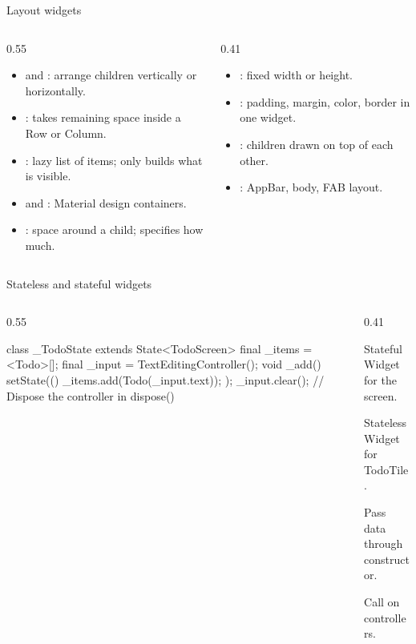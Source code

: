 \documentclass[10pt,aspectratio=169,t]{beamer}
\begin{document}
\begin{frame}[eyebrow=Reference]{Layout widgets}
  \begin{columns}[T]
    \begin{column}{0.55\textwidth}
      \begin{itemize}
        \item {} and : arrange children vertically or horizontally.
        \item {}: takes remaining space inside a Row or Column.
        \item {}: lazy list of items; only builds what is visible.
        \item {} and : Material design containers.
        \item {}: space around a child;  specifies how much.
      \end{itemize}
    \end{column}
    \begin{column}{0.41\textwidth}
      \begin{itemize}
        \item {}: fixed width or height.
        \item {}: padding, margin, color, border in one widget.
        \item {}: children drawn on top of each other.
        \item {}: AppBar, body, FAB layout.
      \end{itemize}
    \end{column}
  \end{columns}
\end{frame}

\begin{frame}[fragile,eyebrow=Task I]{Stateless and stateful widgets}
  \begin{columns}[T]
    \begin{column}{0.55\textwidth}
\begin{dart}
class _TodoState
    extends State<TodoScreen> {
  final _items = <Todo>[];
  final _input = TextEditingController();
  void _add() {
    setState(() {
      _items.add(Todo(_input.text));
    });
    _input.clear();
  }
  // Dispose the controller in dispose()
}
\end{dart}
    \end{column}
    \begin{column}{0.41\textwidth}
      \begin{steps}
        \item StatefulWidget for the screen.
        \item StatelessWidget for TodoTile.
        \item Pass data through constructor.
        \item Call  on controllers.
      \end{steps}
    \end{column}
  \end{columns}
\end{frame}
\end{document}
